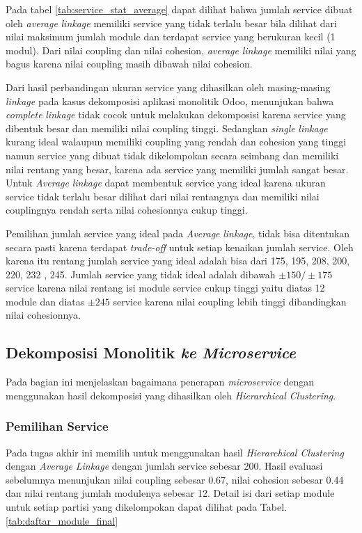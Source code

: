 Pada tabel \ref{tab:service_stat_average} dapat dilihat bahwa jumlah service dibuat oleh \textit{average} \textit{linkage} memiliki service yang tidak terlalu besar bila dilihat dari nilai maksimum jumlah module dan terdapat service yang berukuran kecil (1 modul). Dari nilai coupling dan nilai cohesion, \textit{average} \textit{linkage} memiliki nilai yang bagus karena nilai coupling masih dibawah nilai cohesion. 

Dari hasil perbandingan ukuran service yang dihasilkan oleh masing-masing \textit{linkage} pada kasus dekomposisi aplikasi monolitik Odoo, menunjukan bahwa \textit{complete} \textit{linkage} tidak cocok untuk melakukan dekomposisi karena service yang dibentuk besar dan memiliki nilai coupling tinggi. Sedangkan \textit{single} \textit{linkage} kurang ideal walaupun memiliki coupling yang rendah dan cohesion yang tinggi namun service yang dibuat tidak dikelompokan secara seimbang dan memiliki nilai rentang yang besar, karena ada service yang memiliki jumlah sangat besar. Untuk \textit{Average} \textit{linkage} dapat membentuk service yang ideal karena ukuran service tidak terlalu besar dilihat dari nilai rentangnya dan memiliki nilai couplingnya rendah serta nilai cohesionnya cukup tinggi. 

Pemilihan jumlah service yang ideal pada \textit{Average} \textit{linkage}, tidak bisa ditentukan secara pasti karena terdapat \textit{trade-off} untuk setiap kenaikan jumlah service. Oleh karena itu rentang jumlah service yang ideal adalah bisa dari 175, 195, 208, 200, 220, 232 , 245. Jumlah service yang tidak ideal adalah dibawah $\pm 150 / \pm 175$ service karena nilai rentang isi module service cukup tinggi yaitu diatas 12 module dan diatas $\pm 245$ service karena nilai coupling lebih tinggi dibandingkan nilai cohesionnya. \\

\pagebreak

\subsection{Dekomposisi Monolitik \textit{ ke \textit{Microservice}}}
Pada bagian ini menjelaskan bagaimana penerapan \textit{microservice} dengan menggunakan hasil dekomposisi yang dihasilkan oleh \textit{Hierarchical Clustering}. 

\subsubsection{Pemilihan Service}
Pada tugas akhir ini memilih untuk menggunakan hasil \textit{Hierarchical Clustering} dengan \textit{Average} \textit{Linkage} dengan jumlah service sebesar 200. Hasil evaluasi sebelumnya menunjukan nilai coupling sebesar 0.67, nilai cohesion sebesar 0.44 dan nilai rentang jumlah modulenya sebesar 12. Detail isi dari setiap module untuk setiap partisi yang dikelompokan dapat dilihat pada Tabel. \ref{tab:daftar_module_final} 

